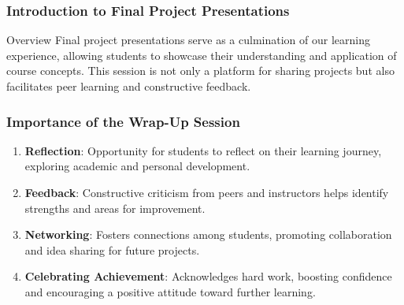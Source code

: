 \documentclass[aspectratio=169]{beamer}
\begin{document}
\frame{\titlepage}

\begin{frame}[fragile]
    \frametitle{Introduction to Final Project Presentations}
    \begin{block}{Overview}
        Final project presentations serve as a culmination of our learning experience, allowing students to showcase their understanding and application of course concepts. This session is not only a platform for sharing projects but also facilitates peer learning and constructive feedback.
    \end{block}
\end{frame}

\begin{frame}[fragile]
    \frametitle{Importance of the Wrap-Up Session}
    \begin{enumerate}
        \item \textbf{Reflection}: Opportunity for students to reflect on their learning journey, exploring academic and personal development.
        \item \textbf{Feedback}: Constructive criticism from peers and instructors helps identify strengths and areas for improvement.
        \item \textbf{Networking}: Fosters connections among students, promoting collaboration and idea sharing for future projects.
        \item \textbf{Celebrating Achievement}: Acknowledges hard work, boosting confidence and encouraging a positive attitude toward further learning.
    \end{enumerate}
\end{frame}
\end{document}
